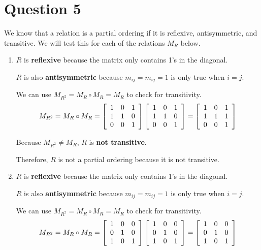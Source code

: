 \documentclass[letterpaper, 12pt]{article}
\begin{document}
\section*{Question 5}
We know that a relation is a partial ordering if it is reflexive, antisymmetric, and transitive. We will test this for each of the relations $M_R$ below.

\begin{enumerate}
    \item $R$ is \textbf{reflexive} because the matrix only contains 1's in the diagonal. 
    
    $R$ is also \textbf{antisymmetric} because $m_{ij} = m_{ij} = 1$ is only true when $i = j$.
    
    We can use $M_{R^2} = M_R \circ M_R = M_R$ to check for transitivity.
    \[
    M_{R^2} = M_R \circ M_R =
    \left[
    \begin{array}{c c c}
         1 & 0 & 1 \\
         1 & 1 & 0 \\
         0 & 0 & 1
    \end{array}
    \right]
    \left[
    \begin{array}{c c c}
         1 & 0 & 1 \\
         1 & 1 & 0 \\
         0 & 0 & 1
    \end{array}
    \right]
    =
    \left[
    \begin{array}{c c c}
         1 & 0 & 1 \\
         1 & 1 & 1 \\
         0 & 0 & 1
    \end{array}
    \right]
    \]
    
    Because $M_{R^2} \neq M_R$, $R$ is \textbf{not transitive}.
    
    Therefore, $R$ is not a partial ordering because it is not transitive.
    
    \item $R$ is \textbf{reflexive} because the matrix only contains 1's in the diagonal. 
    
    $R$ is also \textbf{antisymmetric} because $m_{ij} = m_{ij} = 1$ is only true when $i = j$.
    
    We can use $M_{R^2} = M_R \circ M_R = M_R$ to check for transitivity.
    \[
    M_{R^2} = M_R \circ M_R =
    \left[
    \begin{array}{c c c}
         1 & 0 & 0 \\
         0 & 1 & 0 \\
         1 & 0 & 1
    \end{array}
    \right]
    \left[
    \begin{array}{c c c}
         1 & 0 & 0 \\
         0 & 1 & 0 \\
         1 & 0 & 1
    \end{array}
    \right]
    =
    \left[
    \begin{array}{c c c}
         1 & 0 & 0 \\
         0 & 1 & 0 \\
         1 & 0 & 1
    \end{array}
    \right]
    \]
    

\end{enumerate}
\end{document}
